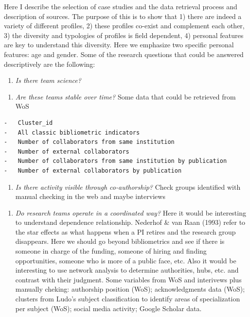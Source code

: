 \documentclass[]{elsarticle} %
\providecommand{\tightlist}{%
  \setlength{\itemsep}{0pt}\setlength{\parskip}{0pt}}
\begin{document}
Here I describe the selection of case studies and the data retrieval
process and description of sources. The purpose of this is to show that
1) there are indeed a variety of different profiles, 2) these profiles
co-exist and complement each other, 3) the diversity and typologies of
profiles is field dependent, 4) personal features are key to understand
this diversity. Here we emphasize two specific personal features: age
and gender. Some of the research questions that could be answered
descriptively are the following:

\begin{enumerate}
\def\labelenumi{\arabic{enumi}.}
\tightlist
\item
  \emph{Is there team science?}
\end{enumerate}

\begin{enumerate}
\def\labelenumi{\roman{enumi}.}
\tightlist
\item
  \emph{Are these teams stable over time?} Some data that could be
  retrieved from WoS
\end{enumerate}

\begin{verbatim}
-   Cluster_id
-   All classic bibliometric indicators
-   Number of collaborators from same institution
-   Number of external collaborators
-   Number of collaborators from same institution by publication
-   Number of external collaborators by publication
\end{verbatim}

\begin{enumerate}
\def\labelenumi{\roman{enumi}.}
\setcounter{enumi}{1}
\tightlist
\item
  \emph{Is there activity visible through co-authorship?} Check groups
  identified with manual checking in the web and maybe interviews
\end{enumerate}

\begin{enumerate}
\def\labelenumi{\arabic{enumi}.}
\setcounter{enumi}{1}
\tightlist
\item
  \emph{Do research teams operate in a coordinated way?} Here it would
  be interesting to understand dependence relationship. Nederhof \& van
  Raan (1993) refer to the star effects as what happens when a PI
  retires and the research group disappears. Here we should go beyond
  bibliometrics and see if there is someone in charge of the funding,
  someone of hiring and finding opportunities, someone who is more of a
  public face, etc. Also it would be interesting to use network analysis
  to determine authorities, hubs, etc. and contrast with their judgment.
  Some variables from WoS and interivews plus manually cheking:
  authorship position (WoS); acknowledgments data (WoS); clusters from
  Ludo's subject classification to identify areas of specialization per
  subject (WoS); social media activity; Google Scholar data.
\end{enumerate}
\end{document}
